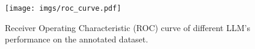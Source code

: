 \begin{figure}[!t] 
 \centering
 \texttt{[image: imgs/roc\_curve.pdf]}
 \caption{Receiver Operating Characteristic (ROC) curve of different LLM's performance on the annotated dataset. }
\label{fig:roc}
\end{figure}
